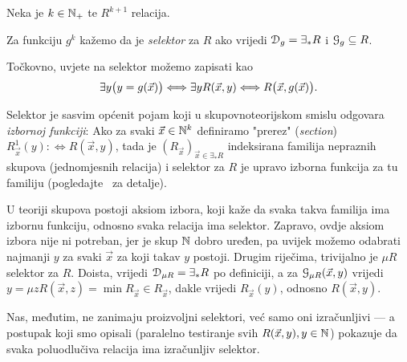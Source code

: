 \begin{definicija}[{name=[selektor]}]
Neka je $k\in{\mathbb N}_+$ te $R^{k+1}$ relacija.

Za funkciju $g^k$ kažemo da je \emph{selektor} za $R$ ako vrijedi $\mathcal D_{g}=\exists_*R$ i $\mathcal G_{g}\subseteq R$.
\end{definicija}

Točkovno, uvjete na selektor možemo zapisati kao
\begin{equation}
    \exists y\bigl(y=g(\vec x)\bigr)\Longleftrightarrow\exists yR(\vec x,y)\Longleftrightarrow R\bigl(\vec x,g(\vec x)\bigr)\text.
\end{equation}

Selektor je sasvim općenit pojam koji u skupovnoteorijskom smislu odgovara \emph{izbornoj funkciji}: Ako za svaki $\vec x\in{\mathbb N}^k$ definiramo "prerez" (\emph{section}) $R_{\vec x}^1(y):\Longleftrightarrow R(\vec x,y)$,
tada je $(R_{\vec x})_{\vec x\in\exists_*R}$ indeksirana familija nepraznih skupova (jednomjesnih relacija) i selektor za $R$ je upravo izborna funkcija za tu familiju (pogledajte~\cite[str.\ 92]{skr:VukTS} za detalje).

U teoriji skupova postoji aksiom izbora, koji kaže da svaka takva familija ima izbornu funkciju, odnosno svaka relacija ima selektor. Zapravo, ovdje aksiom izbora nije ni potreban, jer je skup ${\mathbb N}$ dobro uređen, pa uvijek možemo odabrati najmanji $y$ za svaki $\vec x$ za koji takav $y$ postoji. Drugim riječima, trivijalno je $\mu R$ selektor za $R$. Doista, vrijedi $\mathcal D_{\mu R}=\exists_*R$ po definiciji, a za $\mathcal G_{\mu R}(\vec x,y)$ vrijedi $y=\mu z R(\vec x,z)=\min R_{\vec x}\in R_{\vec x}$, dakle vrijedi $R_{\vec x}(y)$, odnosno $R(\vec x,y)$.

Nas, međutim, ne zanimaju proizvoljni selektori, već samo oni izračunljivi --- a postupak koji smo opisali (paralelno testiranje svih $R(\vec x,y),y\in{\mathbb N}$) pokazuje da svaka poluodlučiva relacija ima izračunljiv selektor.

